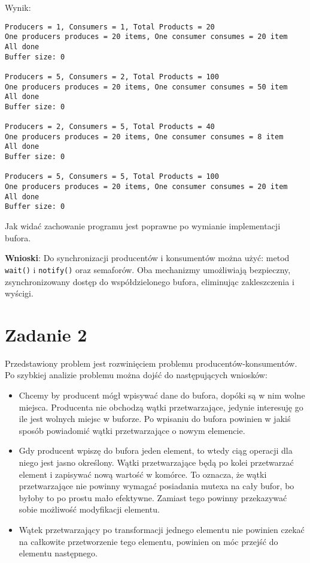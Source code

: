 \documentclass[11pt]{article}
\begin{document}
Wynik:
\begin{tcolorbox}
\begin{Verbatim}
Producers = 1, Consumers = 1, Total Products = 20
One producers produces = 20 items, One consumer consumes = 20 item
All done
Buffer size: 0

Producers = 5, Consumers = 2, Total Products = 100
One producers produces = 20 items, One consumer consumes = 50 item
All done
Buffer size: 0

Producers = 2, Consumers = 5, Total Products = 40
One producers produces = 20 items, One consumer consumes = 8 item
All done
Buffer size: 0

Producers = 5, Consumers = 5, Total Products = 100
One producers produces = 20 items, One consumer consumes = 20 item
All done
Buffer size: 0
\end{Verbatim}


\end{tcolorbox}Jak widać zachowanie programu jest poprawne po wymianie implementacji bufora.

\textbf{Wnioski}: Do synchronizacji producentów i
konsumentów można użyć: metod  \texttt{wait()} i \texttt{notify()} oraz semaforów. Oba mechanizmy
umożliwiają bezpieczny, zsynchronizowany dostęp do współdzielonego bufora,
eliminując zakleszczenia i wyścigi.
\section*{Zadanie 2}
\label{sec:orgcc2a4ae}
Przedstawiony problem jest rozwinięciem problemu producentów-konsumentów.
Po szybkiej analizie problemu można dojść do następujących wniosków:

\begin{itemize}
\item Chcemy by producent mógł wpisywać dane do bufora, dopóki są w nim wolne
miejsca. Producenta nie obchodzą wątki przetwarzające, jedynie interesuję
go ile jest wolnych miejsc w buforze. Po wpisaniu do bufora powinien
w jakiś sposób powiadomić wątki przetwarzające o nowym elemencie.
\item Gdy producent wpiszę do bufora jeden element, to wtedy ciąg operacji
dla niego jest jasno określony. Wątki przetwarzające będą po kolei
przetwarzać element i zapisywać nową wartość w komórce.
To oznacza, że wątki przetwarzające nie powinny wymagać
posiadania mutexa na cały bufor, bo byłoby to po prostu mało efektywne.
Zamiast tego powinny przekazywać sobie możliwość modyfikacji elementu.
\item Wątek przetwarzający po transformacji jednego elementu nie powinien czekać
na całkowite przetworzenie tego elementu, powinien on móc przejść do elementu
następnego.
\end{itemize}
\end{document}
